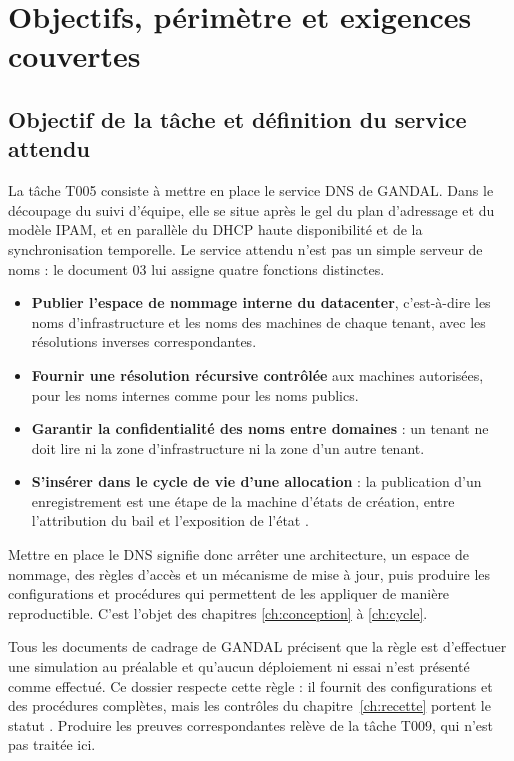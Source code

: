 \chapter{Objectifs, périmètre et exigences couvertes}
\label{ch:objectifs}

\section{Objectif de la tâche et définition du service attendu}

La tâche T005 consiste à mettre en place le service DNS de GANDAL. Dans le
découpage du suivi d'équipe, elle se situe après le gel du plan d'adressage et
du modèle IPAM, et en parallèle du DHCP haute disponibilité et de la
synchronisation temporelle. Le service attendu n'est pas un simple serveur de
noms : le document 03 lui assigne quatre fonctions distinctes.

\begin{itemize}
  \item \textbf{Publier l'espace de nommage interne du datacenter}, c'est-à-dire
    les noms d'infrastructure et les noms des machines de chaque tenant, avec
    les résolutions inverses correspondantes.
  \item \textbf{Fournir une résolution récursive contrôlée} aux machines
    autorisées, pour les noms internes comme pour les noms publics.
  \item \textbf{Garantir la confidentialité des noms entre domaines} : un tenant
    ne doit lire ni la zone d'infrastructure ni la zone d'un autre tenant.
  \item \textbf{S'insérer dans le cycle de vie d'une allocation} : la publication
    d'un enregistrement est une étape de la machine d'états de création, entre
    l'attribution du bail et l'exposition de l'état .
\end{itemize}

Mettre en place le DNS signifie donc arrêter une architecture, un espace de
nommage, des règles d'accès et un mécanisme de mise à jour, puis produire les
configurations et procédures qui permettent de les appliquer de manière
reproductible. C'est l'objet des chapitres \ref{ch:conception} à
\ref{ch:cycle}.

\begin{encadre}
Tous les documents de cadrage de GANDAL précisent que la règle est d'effectuer
une simulation au préalable et qu'aucun déploiement ni essai n'est présenté
comme effectué. Ce dossier respecte cette règle : il fournit des configurations
et des procédures complètes, mais les contrôles du chapitre~\ref{ch:recette}
portent le statut . Produire les preuves correspondantes
relève de la tâche T009, qui n'est pas traitée ici.
\end{encadre}

